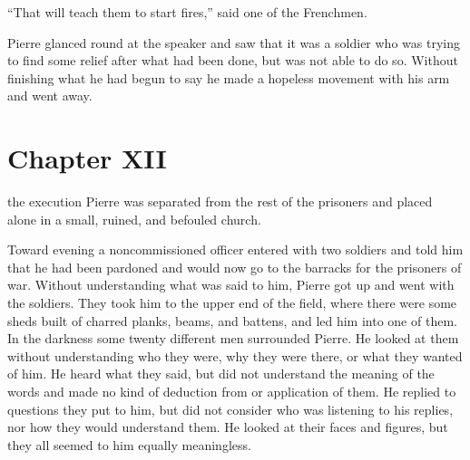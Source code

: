 ``That will teach them to start fires,'' said one of the
Frenchmen.

Pierre glanced round at the speaker and saw that it was a soldier
who was trying to find some relief after what had been done, but
was not able to do so. Without finishing what he had begun to say
he made a hopeless movement with his arm and went away.


\chapter*{Chapter XII} \ifaudio {}
\fi

 the execution Pierre was separated from the rest of the
prisoners and placed alone in a small, ruined, and befouled
church.

Toward evening a noncommissioned officer entered with two
soldiers and told him that he had been pardoned and would now go
to the barracks for the prisoners of war. Without understanding
what was said to him, Pierre got up and went with the
soldiers. They took him to the upper end of the field, where
there were some sheds built of charred planks, beams, and
battens, and led him into one of them. In the darkness some
twenty different men surrounded Pierre. He looked at them without
understanding who they were, why they were there, or what they
wanted of him. He heard what they said, but did not understand
the meaning of the words and made no kind of deduction from or
application of them. He replied to questions they put to him, but
did not consider who was listening to his replies, nor how they
would understand them. He looked at their faces and figures, but
they all seemed to him equally meaningless.

